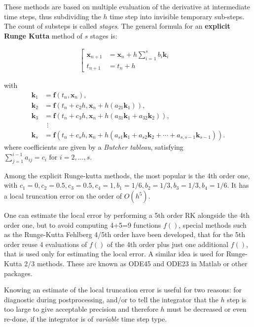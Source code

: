 \documentclass{digitaldynamics}
\def\vect#1{\bm{#1}}
\begin{document}
These methods are based on multiple evaluation of the derivative at intermediate time steps, thus subdividing the $h$ time step into invisible temporary sub-steps.
The count of substeps is called \textit{stages}. The general formula for an \textbf{explicit Runge Kutta} method of $s$ stages is:
\begin{fleqn}
\begin{align}
\left[
\begin{aligned}
\vect{x}_{n+1} &= \vect{x}_n + h \sum_{i=1}^s b_i \vect{k}_i  \\
t_{n+1} &= t_n + h &
\end{aligned}
\right.
\end{align}
\end{fleqn}
with 
\begin{align}
 \vect{k}_1 & = \vect{f}(t_n, \vect{x}_n), \\
 \vect{k}_2 & = \vect{f}(t_n+c_2h, \vect{x}_n+h(a_{21}\vect{k}_1)), \\
 \vect{k}_3 & = \vect{f}(t_n+c_3h, \vect{x}_n+h(a_{31}\vect{k}_1+a_{32}\vect{k}_2)), \\
     & \ \ \vdots \\
 \vect{k}_s & = \vect{f}(t_n+c_sh, \vect{x}_n+h(a_{s1}\vect{k}_1+a_{s2}\vect{k}_2+\cdots+a_{s,s-1}\vect{k}_{s-1})).
\end{align}
where coefficients are given by a \textit{Butcher tableau}, satisfying $\sum_{j=1}^{i-1} a_{ij} = c_i \text{ for } i=2, \ldots, s.$

Among the explicit Runge-kutta methods, the most popular is the 4th order one, with $c_1=0, c_2=0.5, c_3=0.5, c_4=1, b_1=1/6, b_2=1/3, b_3=1/3, b_4=1/6$. 
It has a local truncation error on the order of $O ( h^5 )$. 

One can estimate the local error by performing a 5th order RK alongside the 4th order one, but to avoid
computing 4+5=9 functions $f()$, special methods such as the Runge-Kutta Fehlberg 4/5th order have been developed, that for the 5th order reuse 4 evaluations of $f()$ of the 4th order plus just one additional $f()$, that is used only for estimating the local error. A similar idea is used for Runge-Kutta 2/3 methods. These are known as ODE45 and ODE23 in Matlab or other packages.

Knowing an estimate of the local truncation error is useful for two reasons: for diagnostic during postprocessing, and/or to tell the integrator that the $h$ step is too large to give acceptable precision and therefore $h$ must be decreased or even re-done, if the integrator is of \textit{variable} time step type.
\end{document}
